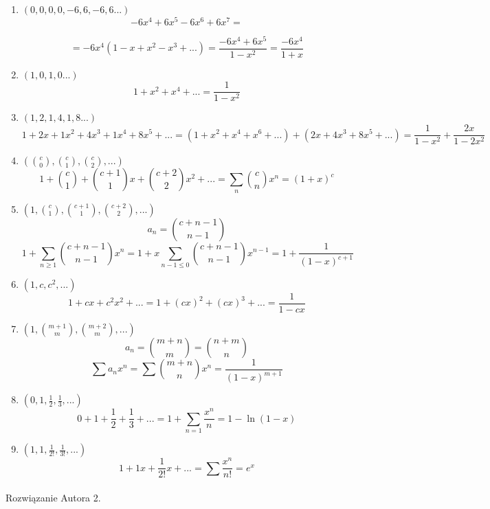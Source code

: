 \documentclass{mwart}
\begin{document}
\begin{mdframed}
    \begin{enumerate}

        \item$(0,0,0,0,-6,6,-6,6...)$
              \[-6x^4 + 6x^5 - 6x^6 + 6x^7 = \]

              \[ = -6x^4(1-x+x^2-x^3 + ...) = \frac{-6x^4+6x^5}{1-x^2} = \frac{-6x^4}{1+x} \]

        \item$(1,0,1,0...)$
              \[1+x^2+x^4+... = \frac{1}{1-x^2}\]

        \item $(1,2,1,4,1,8...)$
              \[1 + 2x + 1x^2 + 4x^3 + 1x^4 + 8x^5 + ... = (1 + x^2 + x^4 + x^6 +...) + (2x+4x^3+8x^5 + ...) = \frac{1}{1-x^2} + \frac{2x}{1-2x^2} \]

        \item $(\binom{c}{0}, \binom{c}{1}, \binom{c}{2}, ...)$
              \[1+ \binom{c}{1}+ \binom{c+1}{1}x+ \binom{c+2}{2}x^2 + ... = \sum_{n}^{}\binom{c}{n}x^n = (1+x)^c \]

        \item $(1, \binom{c}{1}, \binom{c+1}{1}, \binom{c+2}{2}, ...)$
              \[a_n = \binom{c+n-1}{n-1}\]
              \[1 + \sum_{n \geq 1}^{} \binom{c+n-1}{n-1}x^n = 1 + x \sum_{n-1 \leq 0 }^{}\binom{c+n-1}{n-1}x^{n-1} = 1 + \frac{1}{(1-x)^{c+1}}\]

        \item $(1, c, c^2, ...)$
              \[1+cx+c^2x^2+...=1+(cx)^2+(cx)^3+ ... = \frac{1}{1-cx}\]

        \item $(1, \binom{m+1}{m}, \binom{m+2}{m},...)$
              \[a_n = \binom{m+n}{m}  = \binom{n+m}{n} \]
              \[\sum_{}^{}a_nx^n = \sum \binom{m+n}{n}x^n = \frac{1}{(1-x)^{m+1}}\]

        \item $(0, 1, \frac{1}{2}, \frac{1}{3},...)$
              \[0+ 1+ \frac{1}{2}+ \frac{1}{3}+... = 1 + \sum_{n=1}^{}\frac{x^n}{n} = 1 - \ln (1-x)\]

        \item $(1, 1, \frac{1}{2!}, \frac{1}{3!},...)$
              \[1 + 1x+ \frac{1}{2!}x + ... = \sum_{}^{}\frac{x^n}{n!} = e^x\]
    \end{enumerate}
\end{mdframed}
\begin{mdframed}
    Rozwiązanie Autora 2.
\end{mdframed}
\end{document}
